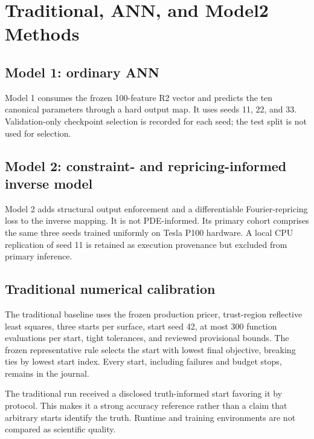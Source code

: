 \section{Traditional, ANN, and Model2 Methods}
\label{sec:methods-comparison}

\subsection{Model 1: ordinary ANN}
Model 1 consumes the frozen 100-feature R2 vector and predicts the ten canonical
parameters through a hard output map. It uses seeds 11, 22, and 33. Validation-only
checkpoint selection is recorded for each seed; the test split is not used for
selection.

\subsection{Model 2: constraint- and repricing-informed inverse model}
Model 2 adds structural output enforcement and a differentiable Fourier-repricing
loss to the inverse mapping. It is not PDE-informed. Its primary cohort comprises the
same three seeds trained uniformly on Tesla P100 hardware. A local CPU replication of
seed 11 is retained as execution provenance but excluded from primary inference.

\subsection{Traditional numerical calibration}
The traditional baseline uses the frozen production pricer, trust-region reflective
least squares, three starts per surface, start seed 42, at most 300 function
evaluations per start, tight tolerances, and reviewed provisional bounds. The frozen
representative rule selects the start with lowest final objective, breaking ties by
lowest start index. Every start, including failures and budget stops, remains in the
journal.

The traditional run received a disclosed truth-informed start favoring it by protocol.
This makes it a strong accuracy reference rather than a claim that arbitrary starts
identify the truth. Runtime and training environments are not compared as scientific
quality.
